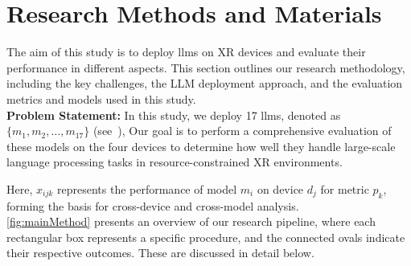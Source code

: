 
\section{Research Methods and Materials} 
\label{sec:method}   
The aim of this study is to deploy \glspl{llm} on XR devices and evaluate their performance in different aspects.
This section outlines our research methodology, including the key challenges, the LLM deployment approach, and the evaluation metrics and models used in this study. \\
\textbf{Problem Statement:} In this study, we deploy 17 \glspl{llm}, denoted as \( \{ m_1, m_2, \dots, m_{17} \} \) (see~),  Our goal is to perform a comprehensive evaluation of these models on the four devices to determine how well they handle large-scale language processing tasks in resource-constrained XR environments. 

Here, \( x_{ijk} \) represents the performance of model \( m_i \) on device \( d_j \) for metric \( p_k \), forming the basis for cross-device and cross-model analysis. \\
\cref{fig:mainMethod}  presents an overview of our research pipeline, where each rectangular box represents a specific procedure, and the connected ovals indicate their respective outcomes. These are discussed in detail below.


